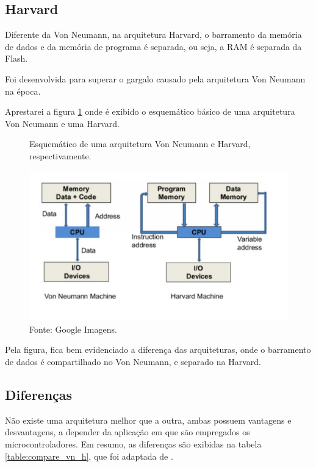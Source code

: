 \documentclass[12pt,a4paper]{report}
\begin{document}
\subsection{Harvard}

Diferente da Von Neumann, na arquitetura Harvard, o barramento da memória de dados e da memória de programa é separada, ou seja, a RAM é separada da Flash.

Foi desenvolvida para superar o gargalo causado pela arquitetura Von Neumann na época.

Aprestarei a figura \ref{fig:compare_h_vn} onde é exibido o esquemático básico de uma arquitetura Von Neumann e uma Harvard.


\begin{figure}[H]      %
\begin{center}		   %
\caption{Esquemático de uma arquitetura Von Neumann e Harvard, respectivamente.}		%
\includegraphics[scale=0.9]{fig/VN_Hardvard_compare.png}
\caption*{Fonte: Google Imagens.}
\label{fig:compare_h_vn}
\end{center}
\end{figure}

Pela figura, fica bem evidenciado a diferença das arquiteturas, onde o barramento de dados é compartilhado no Von Neumann, e separado na Harvard.

\subsection{Diferenças}

Não existe uma arquitetura melhor que a outra, ambas possuem vantagens e desvantagens, a depender da aplicação em que são empregados os microcontroladores. Em resumo, as diferenças são exibidas na tabela \ref{table:compare_vn_h}, que foi adaptada de \cite{ci:von_neu_harv_diff}.
\end{document}
